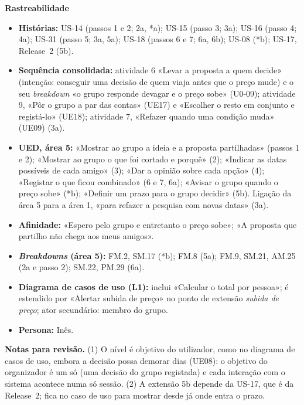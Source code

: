 \documentclass[11pt,a4paper]{article}
\newcommand{\reg}[1]{{\footnotesize\textcolor{pendente}{(#1)}}}
\newenvironment{usecase}[2]{%
  \par\medskip\noindent{\large\bfseries\color{roamly}#1: #2}\par\smallskip\small\noindent\ignorespaces}{\par\medskip}
\begin{document}
\begin{usecase}{UC-04}{Levar o grupo a decidir sobre a proposta}
\textbf{Rastreabilidade}
\begin{itemize}
  \item \textbf{Histórias:} US-14 (passos 1 e 2; 2a, *a); US-15 (passo 3; 3a); US-16 (passo 4; 4a); US-31 (passo 5; 3a, 5a); US-18 (passos 6 e 7; 6a, 6b); US-08 (*b); US-17, Release~2 (5b).
  \item \textbf{Sequência consolidada:} atividade 6 «Levar a proposta a quem decide» (intenção: conseguir uma decisão de quem viaja antes que o preço mude) e o seu \textit{breakdown} «o grupo responde devagar e o preço sobe» \reg{U0-09}; atividade 9, «Pôr o grupo a par das contas» \reg{UE17} e «Escolher o resto em conjunto e registá-lo» \reg{UE18}; atividade 7, «Refazer quando uma condição muda» \reg{UE09} (3a).
  \item \textbf{UED, área 5:} «Mostrar ao grupo a ideia e a proposta partilhadas» (passos 1 e 2); «Mostrar ao grupo o que foi cortado e porquê» (2); «Indicar as datas possíveis de cada amigo» (3); «Dar a opinião sobre cada opção» (4); «Registar o que ficou combinado» (6 e 7, 6a); «Avisar o grupo quando o preço sobe» (*b); «Definir um prazo para o grupo decidir» (5b). Ligação da área 5 para a área 1, «para refazer a pesquisa com novas datas» (3a).
  \item \textbf{Afinidade:} «Espero pelo grupo e entretanto o preço sobe»; «A proposta que partilho não chega aos meus amigos».
  \item \textbf{\textit{Breakdowns} (área 5):} FM.2, SM.17 (*b); FM.8 (5a); FM.9, SM.21, AM.25 (2a e passo 2); SM.22, PM.29 (6a).
  \item \textbf{Diagrama de casos de uso (L1):} inclui «Calcular o total por pessoa»; é estendido por «Alertar subida de preço» no ponto de extensão \textit{subida de preço}; ator secundário: membro do grupo.
  \item \textbf{Persona:} Inês.
\end{itemize}
\end{usecase}

\medskip
{\footnotesize\textbf{Notas para revisão.}
(1) O nível é objetivo do utilizador, como no diagrama de casos de uso, embora a decisão possa demorar dias \reg{UE08}: o objetivo do organizador é um só (uma decisão do grupo registada) e cada interação com o sistema acontece numa só sessão.
(2) A extensão 5b depende da US-17, que é da Release~2; fica no caso de uso para mostrar desde já onde entra o prazo.\par}
\end{document}
